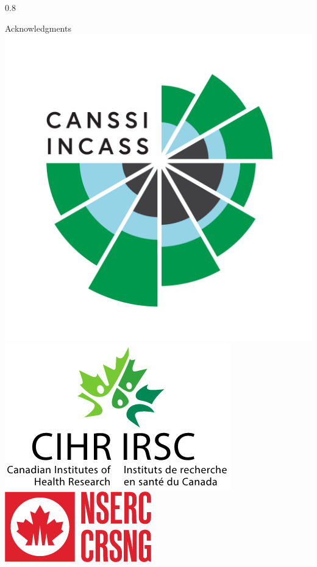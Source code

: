 \documentclass[final]{beamer}
\newlength{\colwidth}
\begin{document}
\begin{frame}[t]
\begin{columns}[t]
\begin{column}{0.8\colwidth}
\begin{block}{Acknowledgments}
    \includegraphics[width=0.2\colwidth]{logos/CANSSI_Logo.png}
    \includegraphics[width=0.3\colwidth]{logos/CIHR_logo.jpg}
    \includegraphics[width=0.25\colwidth]{logos/NSERC_Logo.png}

      
\end{block}

\vspace{-15pt}


\end{column}
\end{columns}
\end{frame}
\end{document}
